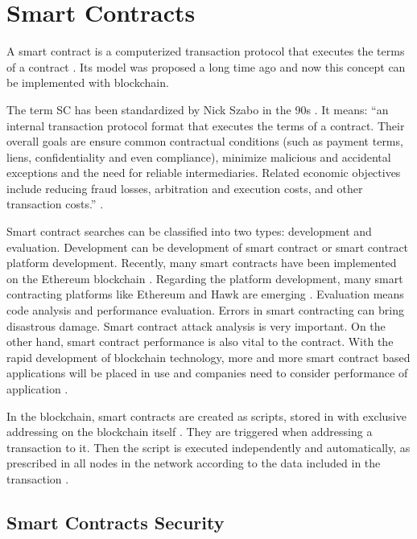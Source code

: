 \section{Smart Contracts}\label{sec:smartContracts}

A smart contract is a computerized transaction protocol that executes the terms of a contract \cite{szabo1997idea}. Its model was proposed a long time ago and now this concept can be implemented with blockchain.

The term \acf{SC} has been standardized by Nick Szabo in the 90s \cite{greve2018blockchain}. It means: “an internal transaction protocol format that executes the terms of a contract. Their overall goals are ensure common contractual conditions (such as payment terms, liens, confidentiality and even compliance), minimize malicious and accidental exceptions and the need for reliable intermediaries. Related economic objectives include reducing fraud losses, arbitration and execution costs, and other transaction costs.” \cite{szabo1997idea}.

Smart contract searches can be classified into two types: development and evaluation. Development can be development of smart contract or smart contract platform development. Recently, many smart contracts have been implemented on the Ethereum blockchain \cite{wood2018secure}. Regarding the platform development, many smart contracting platforms like Ethereum \cite{wood2018secure} and Hawk \cite{kosbaa2016theblockchain} are emerging \cite{zheng2016blockchain}. Evaluation means code analysis and performance evaluation. Errors in smart contracting can bring disastrous damage. Smart contract attack analysis is very important. On the other hand, smart contract performance is also vital to the contract. With the rapid development of blockchain technology, more and more smart contract based applications will be placed in use and companies need to consider performance of application \cite{zheng2016blockchain}.

In the blockchain, smart contracts are created as scripts, stored in with exclusive addressing on the blockchain itself \cite{greve2018blockchain}. They are triggered when addressing a transaction to it. Then the script is executed independently and automatically, as prescribed in all nodes in the network according to the data included in the transaction \cite{christidis2016blockchains}.

\subsection{Smart Contracts Security}\label{sec:seguranca}

